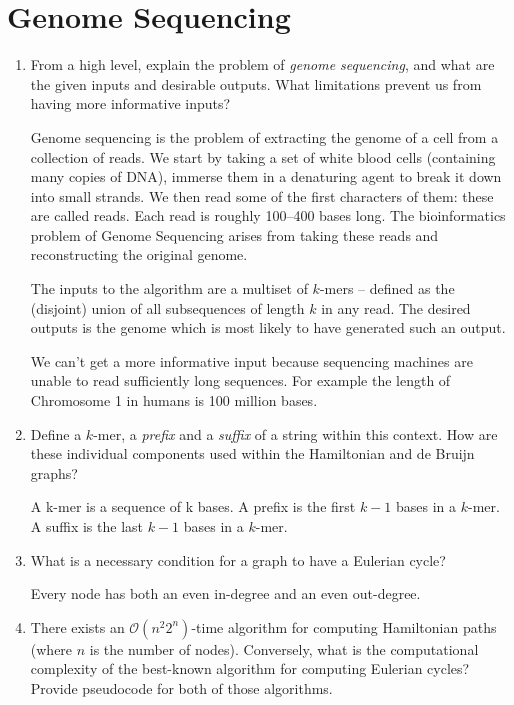 \documentclass[10pt,\jkfside,a4paper]{article}
\begin{document}
\section{Genome Sequencing}

\begin{enumerate}

    \item From a high level, explain the problem of \textit{genome sequencing}, and what are the given inputs and desirable outputs. What limitations prevent us from having more informative inputs?

    Genome sequencing is the problem of extracting the genome of a cell from a collection of reads. We start by taking a set of white blood cells (containing many copies of DNA), immerse them in a denaturing agent
    to break it down into small strands. We then read some of the first characters of them: these are called reads. Each read is roughly 100--400 bases long. The bioinformatics problem of Genome Sequencing
    arises from taking these reads and reconstructing the original genome.

    The inputs to the algorithm are a multiset of $k$-mers -- defined as the (disjoint) union of all subsequences of length $k$ in any read. The desired outputs is the genome which is most likely to have
    generated such an output.

    We can't get a more informative input because sequencing machines are unable to read sufficiently long sequences. For example the length of Chromosome 1 in humans is 100 million bases.

    \item Define a $k$-mer, a \textit{prefix} and a \textit{suffix} of a string within this context. How are these individual components used within the Hamiltonian and de Bruijn graphs?

    A k-mer is a sequence of k bases. A prefix is the first $k - 1$ bases in a $k$-mer. A suffix is the last $k - 1$ bases in a $k$-mer.

    \item What is a necessary condition for a graph to have a Eulerian cycle?

    Every node has both an even in-degree and an even out-degree.

    \item There exists an $\mathcal O(n^2 2^n)$-time algorithm for computing Hamiltonian paths (where $n$ is the number of nodes). Conversely, what is the computational complexity of the best-known algorithm for
    computing Eulerian cycles? Provide pseudocode for both of those algorithms.


\end{enumerate}
\end{document}

